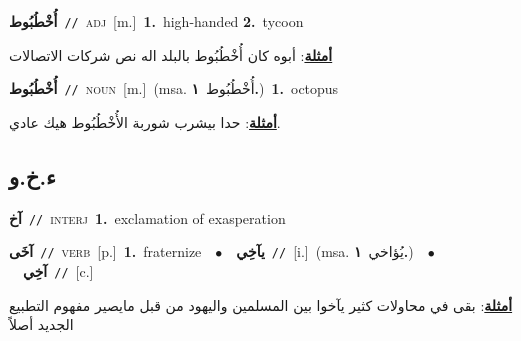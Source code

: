 \documentclass[10pt,a4paper,twoside]{article} %
\begin{document}
\begin{multicols}{2}
{{{{{{{{{\setlength\topsep{0pt}\textbf{\foreignlanguage{arabic}{أُخْطُبُوط}}\ {\color{gray}\texttt{//}\color{black}}\ \textsc{adj}\ [m.]\ \textbf{1.}~high-handed  \textbf{2.}~tycoon\  \begin{flushright}\color{gray}\foreignlanguage{arabic}{\textbf{\underline{\foreignlanguage{arabic}{أمثلة}}}: أبوه كان أُخْطُبُوط بالبلد اله نص شركات الاتصالات}\end{flushright}\color{black}} \vspace{2mm}

{\setlength\topsep{0pt}\textbf{\foreignlanguage{arabic}{أُخْطُبُوط}}\ {\color{gray}\texttt{//}\color{black}}\ \textsc{noun}\ [m.]\ \color{gray}(msa. \foreignlanguage{arabic}{أُخْطُبُوط}~\foreignlanguage{arabic}{\textbf{١.}})\color{black}\ \textbf{1.}~octopus\  \begin{flushright}\color{gray}\foreignlanguage{arabic}{\textbf{\underline{\foreignlanguage{arabic}{أمثلة}}}: حدا بيشرب شوربة الأُخْطُبُوط هيك عادي.}\end{flushright}\color{black}} \vspace{2mm}

\vspace{-3mm}
\subsection*{\color{blue}\foreignlanguage{arabic}{ء.خ.و}\color{blue}{}} 

{\setlength\topsep{0pt}\textbf{\foreignlanguage{arabic}{آخ}}\ {\color{gray}\texttt{//}\color{black}}\ \textsc{interj}\ \textbf{1.}~exclamation of exasperation\ 

{\setlength\topsep{0pt}\textbf{\foreignlanguage{arabic}{آخَى}}\ {\color{gray}\texttt{//}\color{black}}\ \textsc{verb}\ [p.]\ \textbf{1.}~fraternize\ \ $\bullet$\ \ \setlength\topsep{0pt}\textbf{\foreignlanguage{arabic}{يآخِي}}\ {\color{gray}\texttt{//}\color{black}}\ [i.]\ \color{gray}(msa. \foreignlanguage{arabic}{يُؤاخي}~\foreignlanguage{arabic}{\textbf{١.}})\color{black}\ \ $\bullet$\ \ \setlength\topsep{0pt}\textbf{\foreignlanguage{arabic}{آخِي}}\ {\color{gray}\texttt{//}\color{black}}\ [c.]\  \begin{flushright}\color{gray}\foreignlanguage{arabic}{\textbf{\underline{\foreignlanguage{arabic}{أمثلة}}}: بقى في محاولات كثير يآخوا بين المسلمين واليهود من قبل مايصير مفهوم التطبيع الجديد أصلاً}\end{flushright}\color{black}} \vspace{2mm}

}}}}}}}}}
\end{multicols}
\end{document}
